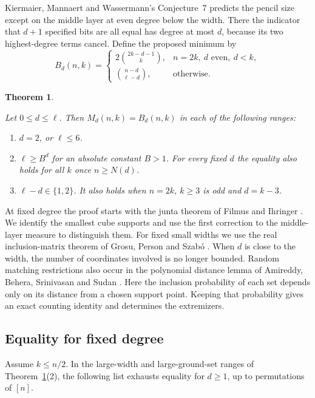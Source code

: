 \documentclass[11pt,letterpaper]{article}
\newtheorem{theorem}{Theorem}[section]
\numberwithin{equation}{section}
\begin{document}
Kiermaier, Mannaert and Wassermann's Conjecture~7 predicts the pencil size except on the
middle layer at even degree below the width. There the indicator that $d+1$ specified bits are
all equal has degree at most $d$, because its two highest-degree terms cancel. Define the
proposed minimum by
\begin{equation}\label{eq:minimum}
B_d(n,k)=
\begin{cases}
2\binom{2k-d-1}{k}, & n=2k,\ d\text{ even},\ d<k,\\[2pt]
\binom{n-d}{\ell-d}, & \text{otherwise}.
\end{cases}
\end{equation}
\begin{theorem}\label{thm:main}

Let $0\le d\le\ell$. Then $M_d(n,k)=B_d(n,k)$ in each of the following ranges:
\begin{enumerate}\setlength{\itemsep}{0pt}
\item $d=2$, or $\ell\le6$.
\item $\ell\ge B^d$ for an absolute constant $B>1$. For every fixed $d$ the equality also holds for all $k$ once $n\ge N(d)$.
\item $\ell-d\in\{1,2\}$. It also holds when $n=2k$, $k\ge3$ is odd and $d=k-3$.
\end{enumerate}
\end{theorem}

At fixed degree the proof starts with the junta theorem of Filmus and Ihringer \cite{fi}. We
identify the smallest cube supports and use the first correction to the middle-layer measure
to distinguish them. For fixed small widths we use the real inclusion-matrix theorem of Grosu,
Person and Szab\'o \cite{gps}. When $d$ is close to the width, the number of coordinates
involved is no longer bounded. Random matching restrictions also occur in the polynomial
distance lemma of Amireddy, Behera, Srinivasan and Sudan \cite{abss}. Here the inclusion
probability of each set depends only on its distance from a chosen support point. Keeping that
probability gives an exact counting identity and determines the extremizers.

\subsection{Equality for fixed degree}\label{sec:fixed}

Assume $k\le n/2$. In the large-width and large-ground-set ranges of
Theorem~\ref{thm:main}(2), the following list exhausts equality for $d\ge1$, up to
permutations of $[n]$.
\end{document}
